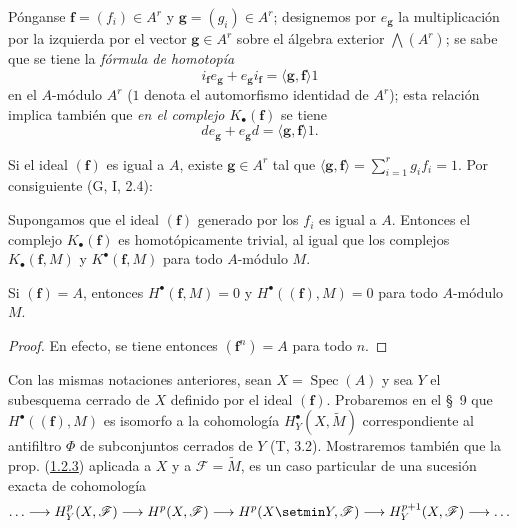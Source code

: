 \begin{env}[1.1.7]
\label{III.1.1.7}
\label{III.1.1.7-fr}
Pónganse $\mathbf f=(f_i)\in A^r$ y $\mathbf g=(g_i)\in A^r$; designemos por $e_{\mathbf g}$ la multiplicación por la izquierda por el vector $\mathbf g\in A^r$ sobre el álgebra exterior $\bigwedge(A^r)$; se sabe que se tiene la \emph{fórmula de homotopía}
\begin{equation}
\label{III.1.1.7.1-fr}
\tag{1.1.7.1}
i_{\mathbf f}e_{\mathbf g}+e_{\mathbf g}i_{\mathbf f}
=\langle\mathbf g,\mathbf f\rangle 1
\end{equation}
en el $A$-módulo $A^r$ ($1$ denota el automorfismo identidad de $A^r$); esta relación implica también que \emph{en el complejo $K_\bullet(\mathbf f)$} se tiene
\begin{equation}
\label{III.1.1.7.2-fr}
\tag{1.1.7.2}
de_{\mathbf g}+e_{\mathbf g}d=\langle\mathbf g,\mathbf f\rangle 1.
\end{equation}

Si el ideal $(\mathbf f)$ es igual a $A$, existe $\mathbf g\in A^r$ tal que $\langle\mathbf g,\mathbf f\rangle=\sum_{i=1}^r g_if_i=1$.
Por consiguiente (G, I, 2.4):
\end{env}

\begin{proposition}[1.1.8]
\label{III.1.1.8}
\label{III.1.1.8-fr}
Supongamos que el ideal $(\mathbf f)$ generado por los $f_i$ es igual a $A$.
Entonces el complejo $K_\bullet(\mathbf f)$ es homotópicamente trivial, al igual que los complejos $K_\bullet(\mathbf f,M)$ y $K^\bullet(\mathbf f,M)$ para todo $A$-módulo $M$.
\end{proposition}

\begin{corollary}[1.1.9]
\label{III.1.1.9}
\label{III.1.1.9-fr}
Si $(\mathbf f)=A$, entonces $H^\bullet(\mathbf f,M)=0$ y $H^\bullet((\mathbf f),M)=0$ para todo $A$-módulo $M$.
\end{corollary}

\begin{proof}
En efecto, se tiene entonces $(\mathbf f^n)=A$ para todo $n$.
\end{proof}

\begin{remark}[1.1.10]
\label{III.1.1.10}
\label{III.1.1.10-fr}
Con las mismas notaciones anteriores, sean $X=\operatorname{Spec}(A)$ y sea $Y$ el subesquema cerrado de $X$ definido por el ideal $(\mathbf f)$. Probaremos en el \S~9 que $H^\bullet((\mathbf f),M)$ es isomorfo a la cohomología $H_Y^\bullet(X,\widetilde M)$ correspondiente al antifiltro $\Phi$ de subconjuntos cerrados de $Y$ (T, 3.2). Mostraremos también que la prop. (\hyperref[III.1.2.3-fr]{1.2.3}) aplicada a $X$ y a $\mathcal F=\widetilde M$, es un caso particular de una sucesión exacta de cohomología
\[
\ldots\longrightarrow H_Y^p(X,\mathcal F)\longrightarrow H^p(X,\mathcal F)
\longrightarrow H^p(X\setmin Y,\mathcal F)\longrightarrow H_Y^{p+1}(X,\mathcal F)
\longrightarrow\ldots
\]
\end{remark}

